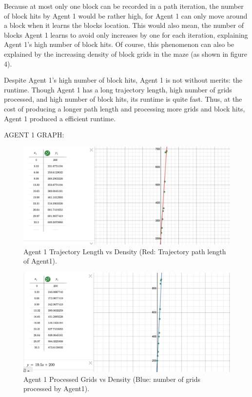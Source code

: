 \documentclass{homeworg}
\begin{document}
Because at most only one block can be recorded in a path iteration, the number of block hits by Agent 1 would be rather high, for Agent 1 can only move around a block when it learns the blocks location. This would also mean, the number of blocks Agent 1 learns to avoid only increases by one for each iteration, explaining Agent 1's high number of block hits. Of course, this phenomenon can also be explained by the increasing density of block grids in the maze (as shown in figure 4).

Despite Agent 1's high number of block hits, Agent 1 is not without merits: the runtime. Though Agent 1 has a long trajectory length, high number of grids processed, and high number of block hits, its runtime is quite fast. Thus, at the cost of producing a longer path length and processing more grids and block hits, Agent 1 produced a efficient runtime.

\newpage
AGENT 1 GRAPH:
\begin{figure}[!htb]
  	\centering
  	\includegraphics*[scale=0.3]{Agent1_traj.png}
	\caption{Agent 1 Trajectory Length vs Density (Red: Trajectory path length of Agent1).}
	\label{fig:example}
\end{figure}

\begin{figure}[!htb]
  	\centering
  	\includegraphics*[scale=0.3]{Agent1.pop.png}
	\caption{Agent 1 Processed Grids vs Density (Blue: number of grids processed by Agent1).}
	\label{fig:example}
\end{figure}
\end{document}
